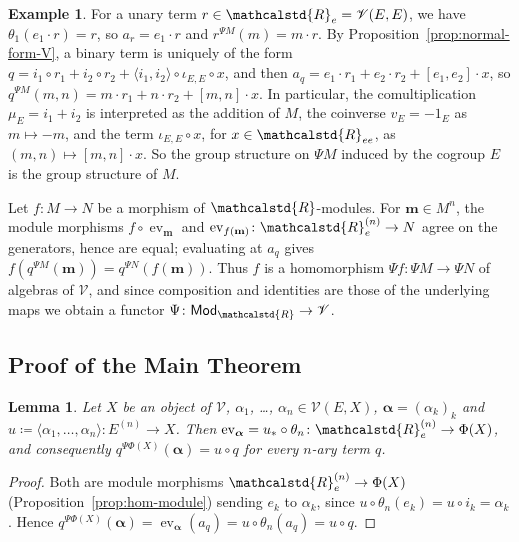 \documentclass[reqno,a4paper]{amsart}
\theoremstyle{plain}
\newtheorem{lemma}[subsection]{Lemma}
\theoremstyle{definition}
\newtheorem{example}[subsection]{Example}
\newcommand{\DefEq}{\coloneq}
\newcommand{\V}{\ensuremath{\mathcal{V}}}
\newcommand{\R}{\ensuremath{\mathcalstd{R}}}
\newcommand{\Mod}{\ensuremath{\mathsf{Mod}}}
\DeclareMathOperator{\ev}{ev}
\renewcommand{\Re}{\ensuremath{\R_{e}}}
\newcommand{\Ree}{\ensuremath{\R_{ee}}}
\newcommand{\brk}[2]{\ensuremath{[#1,#2]}}
\begin{document}
\begin{example}\label{ex:interpretation}
  For a unary term \(r\in\Re=\V(E,E)\), we have \(\theta_{1}(e_{1}\cdot r)=r\), so \(a_{r}=e_{1}\cdot r\) and \(r^{\Psi M}(m)=m\cdot r\). By Proposition~\ref{prop:normal-form-V}, a binary term is uniquely of the form \(q=i_{1}\circ r_{1}+i_{2}\circ r_{2}+\langle i_{1},i_{2}\rangle\circ\iota_{E,E}\circ x\), and then \(a_{q}=e_{1}\cdot r_{1}+e_{2}\cdot r_{2}+\brk{e_{1}}{e_{2}}\cdot x\), so \(q^{\Psi M}(m,n)=m\cdot r_{1}+n\cdot r_{2}+\brk{m}{n}\cdot x\). In particular, the comultiplication \(\mu_{E}=i_{1}+i_{2}\) is interpreted as the addition of \(M\), the coinverse \(v_{E}=-1_{E}\) as \(m\mapsto-m\), and the term \(\iota_{E,E}\circ x\), for \(x\in\Ree\), as \((m,n)\mapsto\brk{m}{n}\cdot x\). So the group structure on \(\Psi M\) induced by the cogroup \(E\) is the group structure of \(M\).
\end{example}

Let \(f\colon M\to N\) be a morphism of \(\R\)-modules. For \(\mathbf{m}\in M^{n}\), the module morphisms \(f\circ\ev_{\mathbf{m}}\) and \(\ev_{f(\mathbf{m})}\colon \Re^{(n)}\to N\) agree on the generators, hence are equal; evaluating at \(a_{q}\) gives \(f(q^{\Psi M}(\mathbf{m}))=q^{\Psi N}(f(\mathbf{m}))\). Thus \(f\) is a homomorphism \(\Psi f\colon \Psi M\to\Psi N\) of algebras of \(\V\), and since composition and identities are those of the underlying maps we obtain a functor \(\Psi\colon \Mod_{\R}\to\V\).

\subsection{Proof of the Main Theorem}\label{sec:proof-main}

\begin{lemma}\label{lem:ev-theta}
  Let \(X\) be an object of \(\V\), \(\alpha_{1}\), \dots, \(\alpha_{n}\in\V(E,X)\), \(\boldsymbol{\alpha}=(\alpha_{k})_{k}\) and \(u\DefEq\langle\alpha_{1},\dots,\alpha_{n}\rangle\colon E^{(n)}\to X\). Then \(\ev_{\boldsymbol{\alpha}}=u_{*}\circ\theta_{n}\colon \Re^{(n)}\to\Phi(X)\), and consequently \(q^{\Psi\Phi(X)}(\boldsymbol{\alpha})=u\circ q\) for every \(n\)-ary term \(q\).
\end{lemma}

\begin{proof}
  Both are module morphisms \(\Re^{(n)}\to\Phi(X)\) (Proposition~\ref{prop:hom-module}) sending \(e_{k}\) to \(\alpha_{k}\), since \(u\circ\theta_{n}(e_{k})=u\circ i_{k}=\alpha_{k}\). Hence \(q^{\Psi\Phi(X)}(\boldsymbol{\alpha})=\ev_{\boldsymbol{\alpha}}(a_{q})=u\circ\theta_{n}(a_{q})=u\circ q\).
\end{proof}
\end{document}
